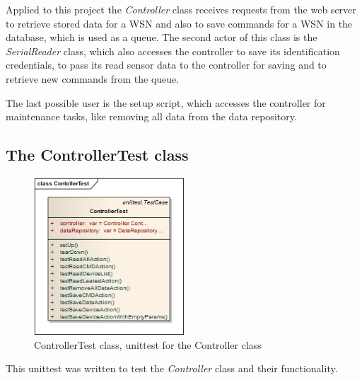 Applied to this project the \textit{Controller} class receives requests from the web server to retrieve stored data for a 
WSN and also to save commands for a WSN in the database, which is used as a queue. The second actor of this class is the 
\textit{SerialReader} class, which also accesses the controller to save its identification credentials, 
to pass its read sensor data to the controller for saving and to retrieve new commands from the queue.

The last possible user is the setup script, which accesses the controller for maintenance tasks, like removing all data from the data repository.



\newpage
\subsection{The ControllerTest class}
\begin{figure}[H]
   \centering
   \includegraphics[width=0.5\textwidth]{pic/ControllerTest.png}%
   \caption{ControllerTest class, unittest for the Controller class}
   \label{ControllerTestpic}%
\end{figure}

This unittest was written to test the \textit{Controller} class and their functionality. 

\newpage
